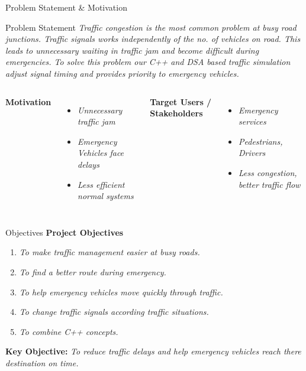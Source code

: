 \documentclass[aspectratio=169,11pt]{beamer}
\newcommand{\placeholder}[1]{\textit{\color{GEUGrey}#1}}
\begin{document}
\begin{frame}{Problem Statement \& Motivation}
\begin{block}{Problem Statement}
\placeholder{Traffic congestion is the most common problem at busy road junctions. Traffic signals works independently of the no. of vehicles on road. This leads to unnecessary waiting in traffic jam and become difficult during emergencies. To solve this problem our C++ and DSA based traffic simulation adjust signal timing and provides priority to emergency vehicles.}
\end{block}
\vspace{2mm}
\begin{columns}[T,totalwidth=\textwidth]
\textbf{\color{GEUBlue}Motivation}
\begin{itemize}\itemsep1pt
\item \placeholder{Unnecessary traffic jam}
\item \placeholder{Emergency Vehicles face delays}
\item \placeholder{Less efficient normal systems}
\end{itemize}
\textbf{\color{GEUBlue}Target Users / Stakeholders}
\begin{itemize}\itemsep1pt
\item \placeholder{Emergency services}
\item \placeholder{Pedestrians, Drivers}
\item \placeholder{Less congestion, better traffic flow }
\end{itemize}
\end{columns}
\end{frame}

\begin{frame}{Objectives}
\textbf{\color{GEUBlue}Project Objectives}
\vspace{2mm}
\begin{enumerate}\itemsep5pt
\item \placeholder{To make traffic management easier at busy roads.}
\item \placeholder{To find a better route during emergency.}
\item \placeholder{To help emergency vehicles move quickly through traffic.}
\item \placeholder{To change traffic signals according traffic situations.}
\item \placeholder{To combine C++ concepts.}
\end{enumerate}
\vfill
\begin{center}
\colorbox{GEULightBlue}{\parbox{.80\textwidth}{\centering
\textbf{Key Objective:} \placeholder{To reduce traffic delays and help emergency vehicles reach there destination on time.}}}
\end{center}
\end{frame}
\end{document}
